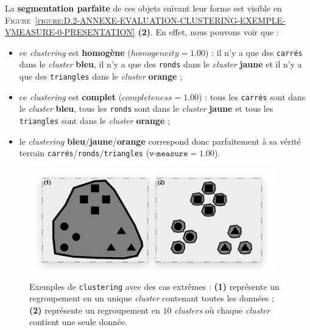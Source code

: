 		La \textbf{segmentation parfaite} de ces objets suivant leur forme est visible en \textsc{Figure~\ref{figure:D.2-ANNEXE-EVALUATION-CLUSTERING-EXEMPLE-VMEASURE-0-PRESENTATION}} \textbf{(2)}.
		En effet, nous pouvons voir que :
		\begin{itemize}
			\item ce \textit{clustering} est \textbf{homogène} ($homogeneity=1.00$) : il n'y a que des \texttt{carrés} dans le \textit{cluster} \textbf{\textcolor{colorSilverLakeBlue}{bleu}}, il n'y a que des \texttt{ronds} dans le \textit{cluster} \textbf{\textcolor{colorMinionYellow}{jaune}} et il n'y a que des \texttt{triangles} dans le \textit{cluster} \textbf{\textcolor{colorCarrotOrange}{orange}} ;
			\item ce \textit{clustering} est \textbf{complet} ($completeness=1.00$) : tous les \texttt{carrés} sont dans le \textit{cluster} \textbf{\textcolor{colorSilverLakeBlue}{bleu}}, tous les \texttt{ronds} sont dans le \textit{cluster} \textbf{\textcolor{colorMinionYellow}{jaune}} et tous les \texttt{triangles} sont dans le \textit{cluster} \textbf{\textcolor{colorCarrotOrange}{orange}} ;
			\item le \textit{clustering} \textbf{\textcolor{colorSilverLakeBlue}{bleu}}/\textbf{\textcolor{colorMinionYellow}{jaune}}/\textbf{\textcolor{colorCarrotOrange}{orange}} correspond donc parfaitement à sa vérité terrain \texttt{carrés}/\texttt{ronds}/\texttt{triangles} ($\texttt{v-measure}=1.00$).
		\end{itemize}
	
		\begin{figure}[H]
			\centering
			\includegraphics[width=0.95\textwidth]{figures/annexe-vmeasure-cas-extremes}
			\caption{
				Exemples de \texttt{clustering} avec des cas extrêmes :
				\textbf{(1)} représente un regroupement en un unique \textit{cluster} contenant toutes les données ;
				\textbf{(2)} représente un regroupement en $10$ \textit{clusters} où chaque \textit{cluster} contient une seule donnée.
			}
			\label{figure:D.2-ANNEXE-EVALUATION-CLUSTERING-EXEMPLE-VMEASURE-1-CAS-EXTREME}
		\end{figure}
		
